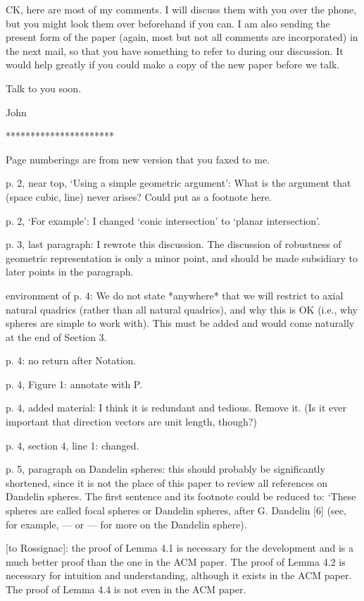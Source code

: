 CK, here are most of my comments.
	I will discuss them with you over the phone,
	but you might look them over beforehand if you can.
	I am also sending the present form of the paper (again, most
	but not all comments are incorporated) in the next mail,
	so that you have something to refer to during our discussion.
	It would help greatly if you could make a copy of the new paper
	before we talk.
	
	Talk to you soon.

John

**********************

Page numberings are from new version that you faxed to me.

p. 2, near top, `Using a simple geometric argument':
	What is the argument that (space cubic, line) never arises?
	Could put as a footnote here.

p. 2, `For example': I changed `conic intersection'
	to `planar intersection'.

p. 3, last paragraph: I rewrote this discussion.
	The discussion of robustness of geometric representation is only 
	a minor point, and should be made subsidiary to later points in
	the paragraph.

environment of p. 4: We do not state *anywhere* that we will restrict to
	axial natural quadrics (rather than all natural quadrics), 
	and why this is OK (i.e., why spheres are simple to work with).
	This must be added and would come naturally at the end of Section 3.

p. 4: no return after Notation.

p. 4, Figure 1: annotate with P.

p. 4, added material: I think it is redundant and tedious.
	Remove it.  (Is it ever important that direction vectors are unit
	length, though?)

p. 4, section 4, line 1: changed.

p. 5, paragraph on Dandelin spheres: this should probably be significantly
	shortened, since it is not the place of this paper to review
	all references on Dandelin spheres.
	The first sentence and its footnote could be reduced to:
	`These spheres are called focal spheres or Dandelin spheres,
	after G. Dandelin [6] (see, for example, --- or --- for more on
	the Dandelin sphere).

[to Rossignac]: the proof of Lemma 4.1 is necessary for the development
	and is a much better proof than the one in the ACM paper.
	The proof of Lemma 4.2 is necessary for intuition and understanding,
	although it exists in the ACM paper.
	The proof of Lemma 4.4 is not even in the ACM paper.
	
